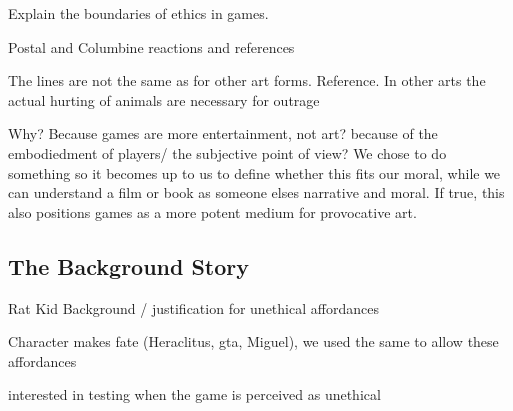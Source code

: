 
Explain the boundaries of ethics in games. \

Postal and Columbine reactions and references\

The lines are not the same as for other art forms. Reference. In other arts the actual hurting of animals are necessary for outrage\

Why? Because games are more entertainment, not art? because of the embodiedment of players/ the subjective point of view? We chose to do something so it becomes up to us to define whether this fits our moral, while we can understand a film or book as someone elses narrative and moral. If true, this also positions games as a more potent medium for provocative art. \ 

\subsection{The Background Story}

Rat Kid Background / justification for unethical affordances\

Character makes fate (Heraclitus, gta, Miguel), we used the same to allow these affordances \

interested in testing when the game is perceived as unethical\
